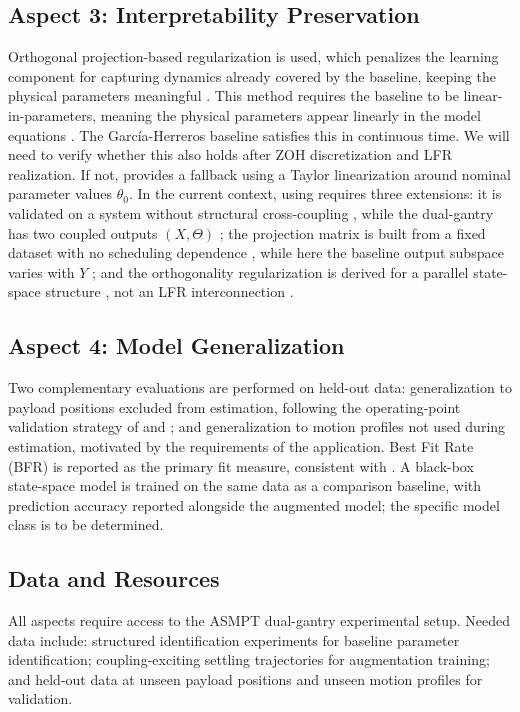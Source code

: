 \subsection*{Aspect 3: Interpretability Preservation}
Orthogonal projection-based regularization \cite{kon2022physics, gyorok2025l4dc} is used, which penalizes the learning component for capturing dynamics already covered by the baseline, keeping the physical parameters meaningful \cite{gyorok2025l4dc}.
This method requires the baseline to be linear-in-parameters, meaning
the physical parameters appear linearly in the model equations
\cite{gyorok2025l4dc}. The Garc\'ia-Herreros baseline
\cite{garcia2013model} satisfies this in continuous time. We will need to verify
whether this also holds after ZOH discretization and LFR realization. If not, \cite{gyorok2025l4dc} provides a fallback using a Taylor
linearization around nominal parameter values $\theta_0$.
In the current context, using \cite{gyorok2025l4dc} requires three extensions: it is validated on a system without 
structural cross-coupling \cite{gyorok2025l4dc}, while the 
dual-gantry has two coupled outputs $(X, \Theta)$ 
\cite{garcia2013model}; the projection matrix is built from a fixed 
dataset with no scheduling dependence \cite{gyorok2025l4dc}, while 
here the baseline output subspace varies with $Y$ 
\cite{garcia2013model}; and the orthogonality regularization is derived for a 
parallel state-space structure \cite{gyorok2025l4dc}, not an LFR 
interconnection \cite{hoekstra2026lfr, drenth2025lpvlfr}.

\subsection*{Aspect 4: Model Generalization}
Two complementary evaluations are performed on held-out data: generalization to payload positions excluded from estimation, following the operating-point validation strategy of \cite{paijmans2008identification} and \cite{bachnas2014review}; and generalization to motion profiles not used during estimation, motivated by the requirements of the application. Best Fit Rate (BFR) is reported as the primary fit measure, consistent with \cite{drenth2025lpvlfr}.
A black-box state-space model is trained on the same data as a comparison baseline, with prediction accuracy reported alongside the augmented model; the specific model class is to be determined.

\subsection*{Data and Resources}
All aspects require access to the ASMPT dual-gantry experimental setup. 
Needed data include: structured identification experiments for baseline parameter identification; coupling-exciting settling trajectories for augmentation training; and held-out data at unseen payload positions and unseen motion profiles for validation. 